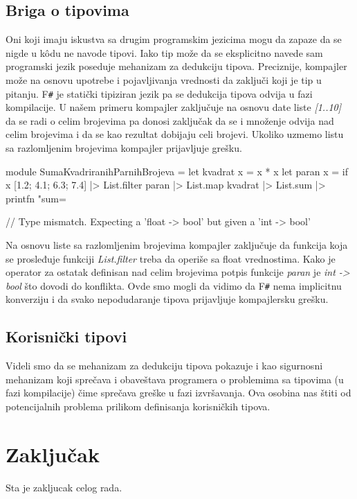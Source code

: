 \documentclass[a4paper]{article}
\begin{document}
\subsection{Briga o tipovima}
Oni koji imaju iskustva sa drugim programskim jezicima mogu da zapaze da se nigde u k\^{o}du ne navode tipovi. Iako tip može da se eksplicitno navede sam programski jezik poseduje mehanizam za dedukciju tipova. Preciznije, kompajler može na osnovu upotrebe i pojavljivanja vrednosti da zaključi koji je tip u pitanju. F\texttt{\#} je statički tipiziran jezik pa se dedukcija tipova odvija u fazi kompilacije. U našem primeru kompajler zaključuje na osnovu date liste \textit{[1..10]} da se radi o celim brojevima pa donosi zaključak da se i množenje odvija nad celim brojevima i da se kao rezultat dobijaju celi brojevi. Ukoliko uzmemo listu sa razlomljenim brojevima kompajler prijavljuje grešku.      
 \begin{fslisting}
module SumaKvadriranihParnihBrojeva =
    let kvadrat x = x * x
    let paran x =  if x %
    [1.2; 4.1; 6.3; 7.4] |> List.filter paran  |> List.map kvadrat |> List.sum |> printfn "sum=%
    
    // Type mismatch. Expecting a 'float -> bool' but given a 'int -> bool'
\end{fslisting} 

Na osnovu liste sa razlomljenim brojevima kompajler zaključuje da funkcija koja se prosleđuje funkciji \textit{List.filter} treba da operiše sa float vrednostima. Kako je operator za ostatak definisan nad celim brojevima potpis funkcije  \textit{paran} je \textit{int -> bool} što dovodi do konflikta. Ovde smo mogli da vidimo da F\texttt{\#} nema implicitnu konverziju i da svako nepodudaranje tipova prijavljuje kompajlersku grešku.  



\subsection{Korisnički tipovi}
Videli smo da se mehanizam za dedukciju tipova pokazuje i kao sigurnosni mehanizam koji sprečava i obaveštava programera o problemima sa tipovima (u fazi kompilacije) čime sprečava greške u fazi izvršavanja. Ova osobina nas štiti od potencijalnih problema prilikom definisanja korisničkih tipova. 

\section{Zaključak}
\label{sec:zakljucak}

Sta je zakljucak celog rada.

\appendix
 

\end{document}
